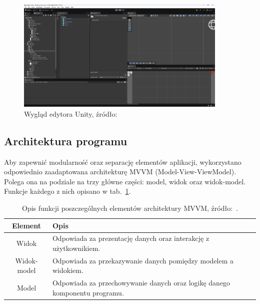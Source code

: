 \begin{figure}[h]
    \centering
    \includegraphics[width=0.9\textwidth]{chapters/chapter3/rys/unity_editor}
    \caption[Widok okna edytora Unity]{Wygląd edytora Unity, źródło: \cite{unity_site}}
    \label{fig:unity_editor}
\end{figure}

\subsection{Architektura programu}
\label{subsec:architektura_programu}

Aby zapewnić modularność oraz separację elementów aplikacji,
wykorzystano odpowiednio zaadaptowana architekturę MVVM (Model-View-ViewModel).
Polega ona na podziale na trzy główne części: model, widok oraz widok-model.
Funkcje każdego z nich opisano w tab.~\ref{tab:mvvm}.

\begin{table}[h]
    \centering
    \caption[Opis funkcji poszczególnych elementów architektury MVVM.]
    {Opis funkcji poszczególnych elementów architektury MVVM, źródło:~\cite{mvvm}.}
    \label{tab:mvvm}
    \begin{tabular}{|c|p{}|}
        \hline
        Element & Opis \\
        \hline
        \hline
        Widok & Odpowiada za prezentację danych oraz interakcję z użytkownikiem. \\
        \hline
        Widok-model & Odpowiada za przekazywanie danych pomiędzy modelem a widokiem. \\
        \hline
        Model & Odpowiada za przechowywanie danych oraz logikę danego komponentu programu. \\
        \hline
    \end{tabular}
\end{table}

